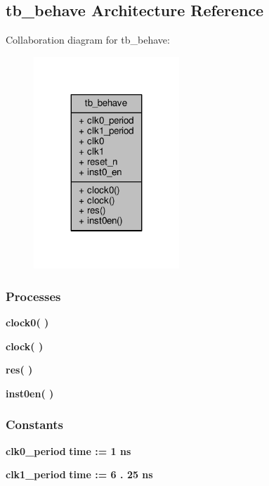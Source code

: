 \subsection{tb\+\_\+behave Architecture Reference}
\label{classhandshake__sync__tb_1_1tb__behave}


Collaboration diagram for tb\+\_\+behave\+:\nopagebreak
\begin{figure}[H]
\begin{center}
\leavevmode
\includegraphics[width=155pt]{d0/d03/classhandshake__sync__tb_1_1tb__behave__coll__graph}
\end{center}
\end{figure}
\subsubsection*{Processes}
 \begin{DoxyCompactItemize}
\item 
{\bf clock0}{\bfseries  (  )}
\item 
{\bf clock}{\bfseries  (  )}
\item 
{\bf res}{\bfseries  (  )}
\item 
{\bf inst0en}{\bfseries  (  )}
\end{DoxyCompactItemize}
\subsubsection*{Constants}
 \begin{DoxyCompactItemize}
\item 
{\bf clk0\+\_\+period} {\bfseries \textcolor{comment}{time}\textcolor{vhdlchar}{ }\textcolor{vhdlchar}{ }\textcolor{vhdlchar}{\+:}\textcolor{vhdlchar}{=}\textcolor{vhdlchar}{ }\textcolor{vhdlchar}{ }\textcolor{vhdlchar}{ } \textcolor{vhdldigit}{1} \textcolor{vhdlchar}{ }\textcolor{vhdlchar}{ns}\textcolor{vhdlchar}{ }} 
\item 
{\bf clk1\+\_\+period} {\bfseries \textcolor{comment}{time}\textcolor{vhdlchar}{ }\textcolor{vhdlchar}{ }\textcolor{vhdlchar}{\+:}\textcolor{vhdlchar}{=}\textcolor{vhdlchar}{ }\textcolor{vhdlchar}{ }\textcolor{vhdlchar}{ } \textcolor{vhdldigit}{6} \textcolor{vhdlchar}{.} \textcolor{vhdldigit}{25} \textcolor{vhdlchar}{ }\textcolor{vhdlchar}{ns}\textcolor{vhdlchar}{ }} 
\end{DoxyCompactItemize}
